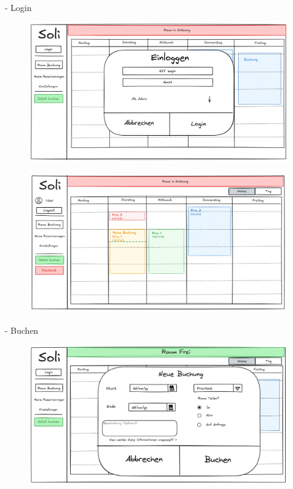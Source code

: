 \documentclass{sdqbeamer}
\begin{document}
\begin{frame}{{\insertsubsectionhead} - Login}
    \begin{figure}
        \centering
        \includegraphics[width=0.75\linewidth]{Benutzeroberfläche/BenutzeroberflächeLogin.png}
        \label{fig:enter-label}
    \end{figure}
\end{frame}

\begin{frame}{\insertsubsectionhead}
    \begin{figure}
        \centering
        \includegraphics[width=0.75\linewidth]{Benutzeroberfläche/BenutzeroberflächeKalender2.png}
        \label{fig:enter-label}
    \end{figure}
\end{frame}

\begin{frame}{{\insertsubsectionhead} - Buchen}
    \begin{figure}
        \centering
        \includegraphics[width=0.75\linewidth]{Benutzeroberfläche/BenutzeroberflächeBuchung.png}
        \label{fig:enter-label}
    \end{figure}
\end{frame}
\end{document}
